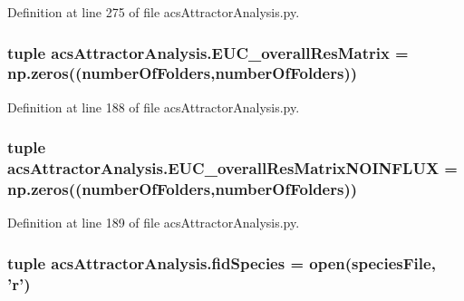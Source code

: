Definition at line 275 of file acs\-Attractor\-Analysis.\-py.

\hypertarget{a00122_a920167afed4efad8feefc27bdbadba89}{
\subsubsection[{E\-U\-C\-\_\-overall\-Res\-Matrix}]{\setlength{\rightskip}{0pt plus 5cm}tuple acs\-Attractor\-Analysis.\-E\-U\-C\-\_\-overall\-Res\-Matrix = np.\-zeros(({\bf number\-Of\-Folders},{\bf number\-Of\-Folders}))}}\label{a00122_a920167afed4efad8feefc27bdbadba89}


Definition at line 188 of file acs\-Attractor\-Analysis.\-py.

\hypertarget{a00122_a4214c876be4247f0643fc749beb35787}{
\subsubsection[{E\-U\-C\-\_\-overall\-Res\-Matrix\-N\-O\-I\-N\-F\-L\-U\-X}]{\setlength{\rightskip}{0pt plus 5cm}tuple acs\-Attractor\-Analysis.\-E\-U\-C\-\_\-overall\-Res\-Matrix\-N\-O\-I\-N\-F\-L\-U\-X = np.\-zeros(({\bf number\-Of\-Folders},{\bf number\-Of\-Folders}))}}\label{a00122_a4214c876be4247f0643fc749beb35787}


Definition at line 189 of file acs\-Attractor\-Analysis.\-py.

\hypertarget{a00122_a604c9f75892d8d8aeac8306c94630a23}{
\subsubsection[{fid\-Species}]{\setlength{\rightskip}{0pt plus 5cm}tuple acs\-Attractor\-Analysis.\-fid\-Species = open({\bf species\-File}, '{\bf r}')}}\label{a00122_a604c9f75892d8d8aeac8306c94630a23}


